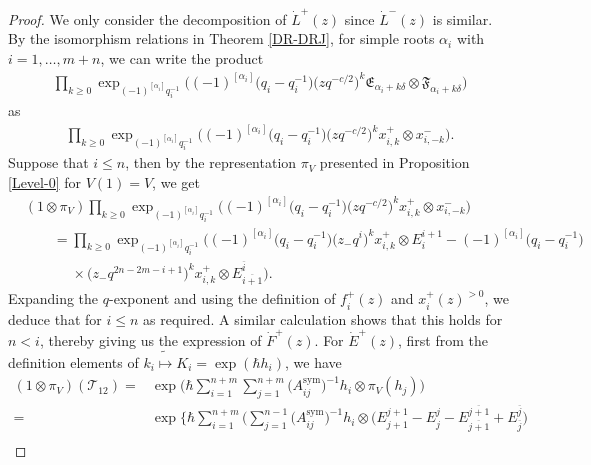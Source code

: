 \documentclass[pdftex]{sigma}
\numberwithin{equation}{section}
\begin{document}
\begin{proof} We only consider the decomposition of $\dot{L}^+(z)$ since $\dot{L}^-(z)$ is similar.
By the isomorphism relations in Theorem \ref{DR-DRJ}, for simple roots $\alpha_i$ with $i=1,\dots,m+n$, we can write the product
\begin{align*}
\prod\limits_{k\geq0 }\exp_{(-1)^{[\alpha_i]}q_{i}^{-1}}\bigl((-1)^{[\alpha_i]}\bigl(q_{i}-q_{i}^{-1}\bigr)\bigl(zq^{-c/2}\bigr)^k\mathfrak{E}_{\alpha_i+k\delta}\otimes \mathfrak{F}_{\alpha_i+k\delta}\bigr)
\end{align*}as
\begin{align*}
\prod\limits_{k\geq0 }\exp_{(-1)^{[\alpha_i]}q_{i}^{-1}}\bigl((-1)^{[\alpha_i]}\bigl(q_{i}-q_{i}^{-1}\bigr)\bigl(zq^{-c/2}\bigr)^k x^{+}_{i,k}\otimes x^{-}_{i,-k}\bigr).
\end{align*}
Suppose that $i\leq n$, then by the representation $\pi_{V}$ presented in Proposition \ref{Level-0} for $V(1)=V$, we get
\begin{align*}
&(1\otimes\pi_V) \prod\limits_{k\geq0 }\exp_{(-1)^{[\alpha_i]}q_{i}^{-1}}\bigl((-1)^{[\alpha_i]}\bigl(q_{i}-q_{i}^{-1}\bigr)\bigl(zq^{-c/2}\bigr)^k x^{+}_{i,k}\otimes x^{-}_{i,-k}\bigr)\\
&\qquad=\prod\limits_{k\geq0 }\exp_{(-1)^{[\alpha_i]}q_{i}^{-1}}\bigl((-1)^{[\alpha_i]}\bigl(q_{i}-q_{i}^{-1}\bigr)\bigl(z_-q^{i}\bigr)^k x^{+}_{i,k}\otimes E^{i+1}_i-(-1)^{[\alpha_i]}\bigl(q_{i}-q_{i}^{-1}\bigr)\\
&\phantom{\qquad=}{}\times\bigl(z_-q^{2n-2m-i+1}\bigr)^k x^{+}_{i,k}\otimes E^{\overline{i}}_{\overline{i+1}}\bigr).
\end{align*}
Expanding the $q$-exponent and using the definition of $f_i^+(z)$ and $x_i^+(z)^{>0}$, we deduce that  for $i\leq n$ as required. A similar calculation shows that this holds for $n<i$, thereby giving us the expression of $\dot{F}^+(z)$.
For $\dot{E}^+(z)$, first from the definition elements of $k_i\tilde{\mapsto} K_i=\exp(\hbar h_i)$, we have
\begin{align*}
(1\otimes\pi_V)(\mathcal{T}_{12})={}&\exp\Biggl(\hbar\sum\limits_{i=1}^{n+m}\sum\limits_{j=1}^{n+m}\bigl(A_{ij}^{\operatorname{sym}}\bigr)^{-1}h_i\otimes\pi_V(h_j)\Biggr)\\
={}&\exp\Biggl\{\hbar\sum\limits_{i=1}^{n+m}\Biggl(\sum\limits_{j=1}^{n-1}\bigl(A_{ij}^{\operatorname{sym}}\bigr)^{-1}h_i\otimes
\bigl(E^{j+1}_{j+1}-E^{j}_{j}-E^{\overline{j+1}}_{\overline{j+1}}+E^{\overline{j}}_{\overline{j}}\bigr)\\

\end{align*}
\end{proof}
\end{document}
